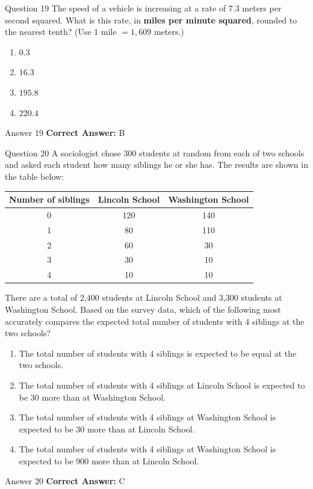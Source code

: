 \documentclass{beamer}
\begin{document}
\begin{frame}{Question 19}
\small
The speed of a vehicle is increasing at a rate of $7.3$ meters per second squared. What is this rate, in \textbf{miles per minute squared}, rounded to the nearest tenth? (Use $1$ mile $= 1{,}609$ meters.)
\vspace{0.35cm}
\begin{enumerate}
    \item[A.] $0.3$
    \item[B.] $16.3$
    \item[C.] $195.8$
    \item[D.] $220.4$
\end{enumerate}
\end{frame}
\begin{frame}{Answer 19}
\small
\textbf{Correct Answer:} B
\end{frame}

\begin{frame}{Question 20}
\small
A sociologist chose 300 students at random from each of two schools and asked each student how many siblings he or she has. The results are shown in the table below:

\begin{center}
\begin{tabular}{|c|c|c|}
\hline
\textbf{Number of siblings} & \textbf{Lincoln School} & \textbf{Washington School} \\
\hline
0 & 120 & 140 \\
1 & 80 & 110 \\
2 & 60 & 30 \\
3 & 30 & 10 \\
4 & 10 & 10 \\
\hline
\end{tabular}
\end{center}

There are a total of 2,400 students at Lincoln School and 3,300 students at Washington School. Based on the survey data, which of the following most accurately compares the expected total number of students with 4 siblings at the two schools?
\vspace{0.35cm}
\begin{enumerate}
    \item[A.] The total number of students with 4 siblings is expected to be equal at the two schools.
    \item[B.] The total number of students with 4 siblings at Lincoln School is expected to be 30 more than at Washington School.
    \item[C.] The total number of students with 4 siblings at Washington School is expected to be 30 more than at Lincoln School.
    \item[D.] The total number of students with 4 siblings at Washington School is expected to be 900 more than at Lincoln School.
\end{enumerate}
\end{frame}
\begin{frame}{Answer 20}
\small
\textbf{Correct Answer:} C
\end{frame}
\end{document}
